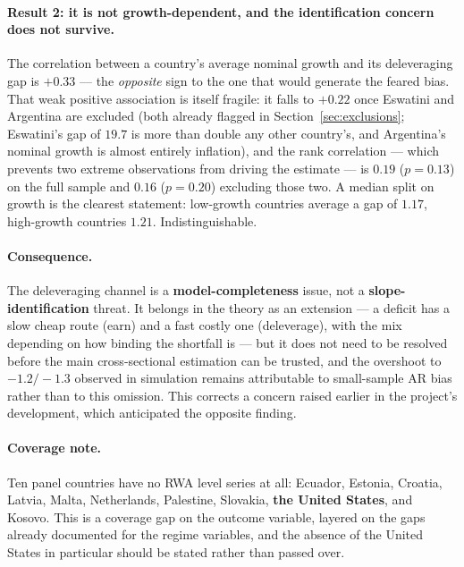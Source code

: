 \documentclass[11pt]{article}
\begin{document}
\paragraph{Result 2: it is not growth-dependent, and the identification
concern does not survive.} The correlation between a country's average
nominal growth and its deleveraging gap is $+0.33$ --- the \emph{opposite}
sign to the one that would generate the feared bias. That weak positive
association is itself fragile: it falls to $+0.22$ once Eswatini and
Argentina are excluded (both already flagged in
Section~\ref{sec:exclusions}; Eswatini's gap of $19.7$ is more than double
any other country's, and Argentina's nominal growth is almost entirely
inflation), and the rank correlation --- which prevents two extreme
observations from driving the estimate --- is $0.19$ ($p = 0.13$) on the
full sample and $0.16$ ($p=0.20$) excluding those two. A median split on
growth is the clearest statement: low-growth countries average a gap of
$1.17$, high-growth countries $1.21$. Indistinguishable.

\paragraph{Consequence.} The deleveraging channel is a
\textbf{model-completeness} issue, not a \textbf{slope-identification}
threat. It belongs in the theory as an extension --- a deficit has a slow
cheap route (earn) and a fast costly one (deleverage), with the mix
depending on how binding the shortfall is --- but it does not need to be
resolved before the main cross-sectional estimation can be trusted, and the
overshoot to $-1.2/-1.3$ observed in simulation remains attributable to
small-sample AR bias rather than to this omission. This corrects a concern
raised earlier in the project's development, which anticipated the opposite
finding.

\paragraph{Coverage note.} Ten panel countries have no RWA level series at
all: Ecuador, Estonia, Croatia, Latvia, Malta, Netherlands, Palestine,
Slovakia, \textbf{the United States}, and Kosovo. This is a coverage gap on
the outcome variable, layered on the gaps already documented for the
regime variables, and the absence of the United States in particular should
be stated rather than passed over.
\end{document}
